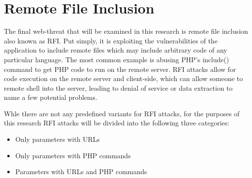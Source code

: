 \section{Remote File Inclusion}\label{sec:rfiExplanation}

The final web-threat that will be examined in this research is remote file inclusion also known as RFI.  Put simply, it is exploiting the vulnerabilities of the application to include remote files which may include arbitrary code of any particular language.  The most common example is abusing PHP's include() command to get PHP code to run on the remote server.  RFI attacks allow for code execution on the remote server and client-side, which can allow someone to remote shell into the server, leading to denial of service or data extraction to name a few potential problems. \cite{owaspRFI}

Whle there are not any predefined variants for RFI attacks, for the purposes of this research RFI attacks will be divided into the following three categories:

\begin{itemize}
	\item Only parameters with URLs
	\item Only parameters with PHP commands
	\item Parameters with URLs and PHP commands
\end{itemize}

